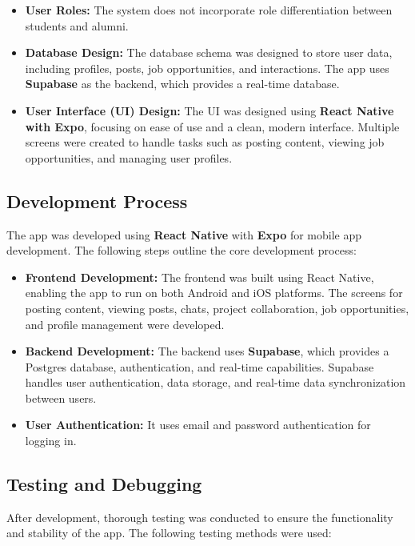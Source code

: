 \begin{itemize}
    \item \textbf{User Roles:} The system does not incorporate role differentiation between students and alumni.
    \item \textbf{Database Design:} The database schema was designed to store user data, including profiles, posts, job opportunities, and interactions. The app uses \textbf{Supabase} as the backend, which provides a real-time database.
    \item \textbf{User Interface (UI) Design:} The UI was designed using \textbf{React Native with Expo}, focusing on ease of use and a clean, modern interface. Multiple screens were created to handle tasks such as posting content, viewing job opportunities, and managing user profiles.
\end{itemize}

\subsection{Development Process}
The app was developed using \textbf{React Native} with \textbf{Expo} for mobile app development. The following steps outline the core development process:

\begin{itemize}
    \item \textbf{Frontend Development:} The frontend was built using React Native, enabling the app to run on both Android and iOS platforms. The screens for posting content, viewing posts, chats, project collaboration, job opportunities, and profile management were developed.
    \item \textbf{Backend Development:} The backend uses \textbf{Supabase}, which provides a Postgres database, authentication, and real-time capabilities. Supabase handles user authentication, data storage, and real-time data synchronization between users.
    \item \textbf{User Authentication:} It uses email and password authentication for logging in.
\end{itemize}

\subsection{Testing and Debugging}
After development, thorough testing was conducted to ensure the functionality and stability of the app. The following testing methods were used:

